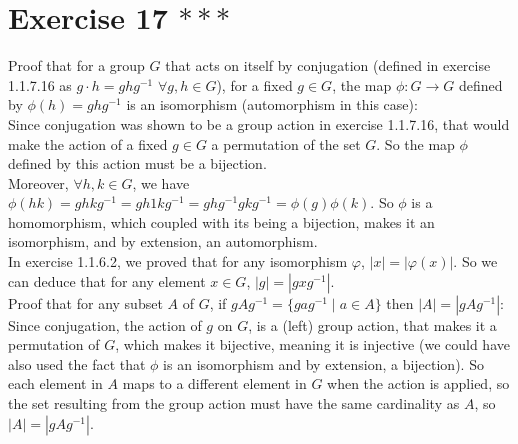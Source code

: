 \documentclass{article}
\begin{document}
    \section*{Exercise 17 $***$}
    Proof that for a group $G$ that acts on itself by conjugation
    (defined in exercise 1.1.7.16
    as $g \cdot h = ghg^{-1}$ $\forall g, h \in G$),
    for a fixed $g \in G$,
    the map $\phi: G \to G$ defined by $\phi(h) = ghg^{-1}$
    is an isomorphism (automorphism in this case): \\
    Since conjugation was shown to be a group action
    in exercise 1.1.7.16,
    that would make the action of a fixed $g \in G$ a permutation
    of the set $G$.
    So the map $\phi$ defined by this action must be a bijection. \\
    Moreover, $\forall h, k \in G$,
    we have $\phi(hk) = ghkg^{-1}
    = gh1kg^{-1}
    = ghg^{-1}gkg^{-1}
    = \phi(g)\phi(k)$.
    So $\phi$ is a homomorphism,
    which coupled with its being a bijection, makes it an isomorphism,
    and by extension, an automorphism. \\ 
    In exercise 1.1.6.2, we proved that for any isomorphism $\varphi$,
    $|x| = |\varphi(x)|$.
    So we can deduce that for any element $x \in G$, $|g| = |gxg^{-1}|$. \\
    Proof that for any subset $A$ of $G$,
    if $gAg^{-1} = \{gag^{-1} \mid a \in A\}$
    then $|A| = |gAg^{-1}|$: \\
    Since conjugation, the action of $g$ on $G$, is a (left) group action,
    that makes it a permutation of $G$,
    which makes it bijective, meaning it is injective
    (we could have also used the fact that $\phi$ is an isomorphism
    and by extension, a bijection).
    So each element in $A$ maps to a different element in $G$
    when the action is applied,
    so the set resulting from the group action must have the same
    cardinality as $A$, so $|A| = |gAg^{-1}|$.
\end{document}
